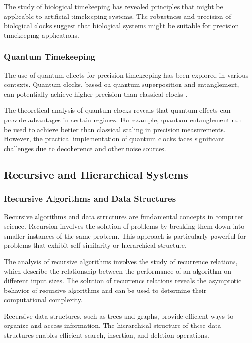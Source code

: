 \documentclass[12pt,a4paper]{article}
\theoremstyle{definition}
\begin{document}
{The study of biological timekeeping has revealed principles that might be applicable to artificial timekeeping systems. The robustness and precision of biological clocks suggest that biological systems might be suitable for precision timekeeping applications.

\subsubsection{Quantum Timekeeping}

The use of quantum effects for precision timekeeping has been explored in various contexts. Quantum clocks, based on quantum superposition and entanglement, can potentially achieve higher precision than classical clocks \cite{giovannetti2011advances}.

The theoretical analysis of quantum clocks reveals that quantum effects can provide advantages in certain regimes. For example, quantum entanglement can be used to achieve better than classical scaling in precision measurements. However, the practical implementation of quantum clocks faces significant challenges due to decoherence and other noise sources.

\subsection{Recursive and Hierarchical Systems}

\subsubsection{Recursive Algorithms and Data Structures}

Recursive algorithms and data structures are fundamental concepts in computer science. Recursion involves the solution of problems by breaking them down into smaller instances of the same problem. This approach is particularly powerful for problems that exhibit self-similarity or hierarchical structure.

The analysis of recursive algorithms involves the study of recurrence relations, which describe the relationship between the performance of an algorithm on different input sizes. The solution of recurrence relations reveals the asymptotic behavior of recursive algorithms and can be used to determine their computational complexity.

Recursive data structures, such as trees and graphs, provide efficient ways to organize and access information. The hierarchical structure of these data structures enables efficient search, insertion, and deletion operations.

}
\end{document}
